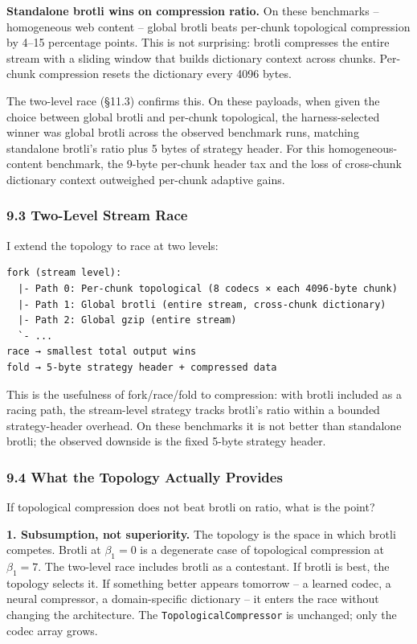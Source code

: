 \documentclass[
  11pt,
]{article}
\begin{document}
\textbf{Standalone brotli wins on compression ratio.} On these
benchmarks -- homogeneous web content -- global brotli beats per-chunk
topological compression by 4--15 percentage points. This is not
surprising: brotli compresses the entire stream with a sliding window
that builds dictionary context across chunks. Per-chunk compression
resets the dictionary every 4096 bytes.

The two-level race (§11.3) confirms this. On these payloads, when given
the choice between global brotli and per-chunk topological, the
harness-selected winner was global brotli across the observed benchmark
runs, matching standalone brotli's ratio plus 5 bytes of strategy
header. For this homogeneous-content benchmark, the 9-byte per-chunk
header tax and the loss of cross-chunk dictionary context outweighed
per-chunk adaptive gains.

\subsubsection{9.3 Two-Level Stream Race}\label{two-level-stream-race}

I extend the topology to race at two levels:

\begin{verbatim}
fork (stream level):
  |- Path 0: Per-chunk topological (8 codecs × each 4096-byte chunk)
  |- Path 1: Global brotli (entire stream, cross-chunk dictionary)
  |- Path 2: Global gzip (entire stream)
  `- ...
race → smallest total output wins
fold → 5-byte strategy header + compressed data
\end{verbatim}

This is the usefulness of fork/race/fold to compression: with brotli
included as a racing path, the stream-level strategy tracks brotli's
ratio within a bounded strategy-header overhead. On these benchmarks it
is not better than standalone brotli; the observed downside is the fixed
5-byte strategy header.

\subsubsection{9.4 What the Topology Actually
Provides}\label{what-the-topology-actually-provides}

If topological compression does not beat brotli on ratio, what is the
point?

\textbf{1. Subsumption, not superiority.} The topology is the space in
which brotli competes. Brotli at \(\beta_1 = 0\) is a degenerate case of
topological compression at \(\beta_1 = 7\). The two-level race includes
brotli as a contestant. If brotli is best, the topology selects it. If
something better appears tomorrow -- a learned codec, a neural
compressor, a domain-specific dictionary -- it enters the race without
changing the architecture. The \texttt{TopologicalCompressor} is
unchanged; only the codec array grows.
\end{document}
